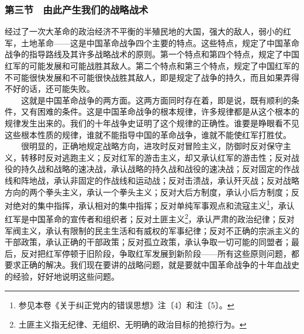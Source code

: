 \documentclass[cn,11pt,chinese]{elegantbook}
\def\myformat#1{\hfil\hfil #1}
\begin{document}
\subsubsection*{\myformat{第三节　由此产生我们的战略战术}}
经过了一次大革命的政治经济不平衡的半殖民地的大国，强大的敌人，弱小的红军，土地革命——这是中国革命战争四个主要的特点。这些特点，规定了中国革命战争的指导路线及其许多战略战术的原则。第一个特点和第四个特点，规定了中国红军的可能发展和可能战胜其敌人。第二个特点和第三个特点，规定了中国红军的不可能很快发展和不可能很快战胜其敌人，即是规定了战争的持久，而且如果弄得不好的话，还可能失败。\\
　　这就是中国革命战争的两方面。这两方面同时存在着，即是说，既有顺利的条件，又有困难的条件。这是中国革命战争的根本规律，许多规律都是从这个根本的规律发生出来的。我们的十年战争史证明了这个规律的正确性。谁要是睁眼看不见这些根本性质的规律，谁就不能指导中国的革命战争，谁就不能使红军打胜仗。\\
　　很明显的，正确地规定战略方向，进攻时反对冒险主义，防御时反对保守主义，转移时反对逃跑主义；反对红军的游击主义，却又承认红军的游击性；反对战役的持久战和战略的速决战，承认战略的持久战和战役的速决战；反对固定的作战线和阵地战，承认非固定的作战线和运动战；反对击溃战，承认歼灭战；反对战略方向的两个拳头主义，承认一个拳头主义；反对大后方制度，承认小后方制度；反对绝对的集中指挥，承认相对的集中指挥；反对单纯军事观点和流寇主义\footnote[14]{ 参见本卷《关于纠正党内的错误思想》注〔4〕和注〔5〕。}，承认红军是中国革命的宣传者和组织者；反对土匪主义\footnote[15]{ 土匪主义指无纪律、无组织、无明确的政治目标的抢掠行为。}，承认严肃的政治纪律；反对军阀主义，承认有限制的民主生活和有威权的军事纪律；反对不正确的宗派主义的干部政策，承认正确的干部政策；反对孤立政策，承认争取一切可能的同盟者；最后，反对把红军停顿于旧阶段，争取红军发展到新阶段——所有这些原则问题，都要求正确的解决。我们现在要讲的战略问题，就是要就中国革命战争的十年血战史的经验，好好地说明这些问题。\\
\end{document}
